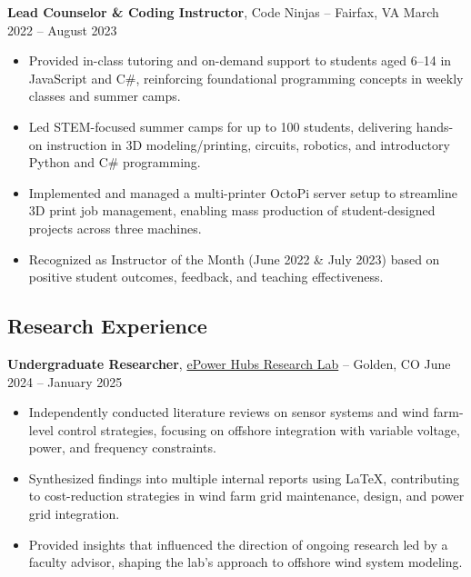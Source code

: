\documentclass[11pt]{article}       %
\begin{document}
\textbf{Lead Counselor \& Coding Instructor}, Code Ninjas -- Fairfax, VA \hfill March 2022 -- August 2023
\vspace{-6pt}
\begin{itemize}
    \item Provided in-class tutoring and on-demand support to students aged 6–14 in JavaScript and C\#, reinforcing foundational programming concepts in weekly classes and summer camps.
    \item Led STEM-focused summer camps for up to 100 students, delivering hands-on instruction in 3D modeling/printing, circuits, robotics, and introductory Python and C\# programming.
    \item Implemented and managed a multi-printer OctoPi server setup to streamline 3D print job management, enabling mass production of student-designed projects across three machines.
    \item Recognized as Instructor of the Month (June 2022 \& July 2023) based on positive student outcomes, feedback, and teaching effectiveness.
\end{itemize}

\vspace{-6pt}
\subsection*{Research Experience}
\vspace{3pt}

\textbf{Undergraduate Researcher}, \href{https://www.epowerhubs.com/home}{ePower Hubs Research Lab} -- Golden, CO \hfill June 2024 -- January 2025
\vspace{-6pt}
\begin{itemize}
  \item Independently conducted literature reviews on sensor systems and wind farm-level control strategies, focusing on offshore integration with variable voltage, power, and frequency constraints.
  \item Synthesized findings into multiple internal reports using LaTeX, contributing to cost-reduction strategies in wind farm grid maintenance, design, and power grid integration.
  \item Provided insights that influenced the direction of ongoing research led by a faculty advisor, shaping the lab's approach to offshore wind system modeling.
\end{itemize}
\end{document}
